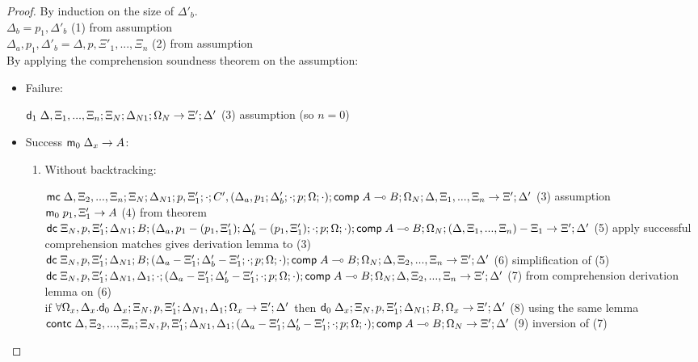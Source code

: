 \begin{proof}
   By induction on the size of $\Delta'_b$.\\

   $\Delta_b = p_1, \Delta'_b$ \hfill (1) from assumption \\
   $\Delta_a, p_1, \Delta'_b = \Delta, p, \Xi'_1, ..., \Xi_n$ \hfill (2) from assumption \\
   By applying the comprehension soundness theorem on the assumption:\\
      
   \begin{itemize}
      \item Failure:
         
      $\mathsf{d}_1 \; \Delta, \Xi_1, ..., \Xi_n; \Xi_N; \Delta_{N1}; \Omega_N \rightarrow \Xi'; \Delta'$ \hfill (3) assumption (so $n = 0$)\\
         
      \item Success $\mathsf{m}_0 \; \Delta_x \rightarrow A$:
      
      \begin{enumerate}
         
         \item Without backtracking:
         
         $\mathsf{mc} \; \Delta, \Xi_2, ..., \Xi_n; \Xi_N; \Delta_{N1}; p, \Xi'_1; \cdot; C', (\Delta_a, p_1; \Delta'_b; \cdot; p; \Omega; \cdot); \mathsf{comp} \; A \multimap B; \Omega_N; \Delta, \Xi_1, ..., \Xi_n \rightarrow \Xi'; \Delta'$ \hfill (3) assumption \\
         $\mathsf{m}_0 \; p_1, \Xi'_1 \rightarrow A$ \hfill (4) from theorem\\
         $\mathsf{dc} \; \Xi_N, p, \Xi'_1; \Delta_{N1}; B; (\Delta_a, p_1 - (p_1, \Xi'_1); \Delta'_b - (p_1, \Xi'_1); \cdot; p; \Omega; \cdot); \mathsf{comp} \; A \multimap B; \Omega_N; (\Delta, \Xi_1, ..., \Xi_n) - \Xi_1 \rightarrow \Xi'; \Delta'$ \hfill (5) apply successful comprehension matches gives derivation lemma to (3) \\
         $\mathsf{dc} \; \Xi_N, p, \Xi'_1; \Delta_{N1}; B; (\Delta_a - \Xi'_1; \Delta'_b - \Xi'_1; \cdot; p; \Omega; \cdot); \mathsf{comp} \; A \multimap B; \Omega_N; \Delta, \Xi_2, ..., \Xi_n \rightarrow \Xi'; \Delta'$ \hfill (6) simplification of (5) \\
         $\mathsf{dc} \; \Xi_N, p, \Xi'_1; \Delta_{N1}, \Delta_1; \cdot; (\Delta_a - \Xi'_1; \Delta'_b - \Xi'_1; \cdot; p; \Omega; \cdot); \mathsf{comp} \; A \multimap B; \Omega_N; \Delta, \Xi_2, ..., \Xi_n \rightarrow \Xi'; \Delta'$ \hfill (7) from comprehension derivation lemma on (6)\\
         if $\forall \Omega_x, \Delta_x. \mathsf{d}_0 \; \Delta_x; \Xi_N, p, \Xi'_1; \Delta_{N1}, \Delta_1; \Omega_x \rightarrow \Xi'; \Delta'$ then $\mathsf{d}_0 \; \Delta_x; \Xi_N, p, \Xi'_1; \Delta_{N1}; B, \Omega_x \rightarrow \Xi'; \Delta'$ \hfill (8) using the same lemma \\
         $\mathsf{contc} \; \Delta, \Xi_2, ..., \Xi_n; \Xi_N, p, \Xi'_1; \Delta_{N1}, \Delta_1; (\Delta_a - \Xi'_1; \Delta'_b - \Xi'_1; \cdot; p; \Omega; \cdot); \mathsf{comp} \; A \multimap B; \Omega_N \rightarrow \Xi'; \Delta'$ \hfill (9) inversion of (7) \\   
      

\end{enumerate}
\end{itemize}
\end{proof}
